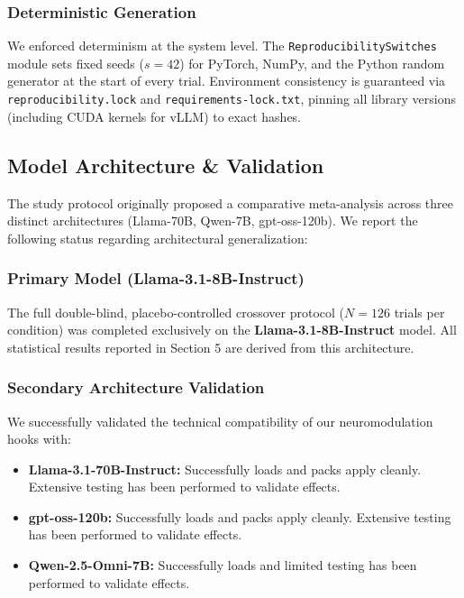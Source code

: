\documentclass[10pt]{article}
\begin{document}
\subsubsection{Deterministic Generation}
We enforced determinism at the system level. The \texttt{ReproducibilitySwitches} module sets fixed seeds ($s=42$) for PyTorch, NumPy, and the Python random generator at the start of every trial. Environment consistency is guaranteed via \texttt{reproducibility.lock} and \texttt{requirements-lock.txt}, pinning all library versions (including CUDA kernels for vLLM) to exact hashes.

\subsection{Model Architecture \& Validation}
The study protocol originally proposed a comparative meta-analysis across three distinct architectures (Llama-70B, Qwen-7B, gpt-oss-120b). We report the following status regarding architectural generalization:

\subsubsection{Primary Model (Llama-3.1-8B-Instruct)}
The full double-blind, placebo-controlled crossover protocol ($N=126$ trials per condition) was completed exclusively on the \textbf{Llama-3.1-8B-Instruct} model. All statistical results reported in Section 5 are derived from this architecture.

\subsubsection{Secondary Architecture Validation}
We successfully validated the technical compatibility of our neuromodulation hooks with:
\begin{itemize}
    \item \textbf{Llama-3.1-70B-Instruct:} Successfully loads and packs apply cleanly. Extensive testing has been performed to validate effects.
    \item \textbf{gpt-oss-120b:} Successfully loads and packs apply cleanly. Extensive testing has been performed to validate effects.
    \item \textbf{Qwen-2.5-Omni-7B:} Successfully loads and limited testing has been performed to validate effects.
    
\end{itemize}

\end{document}
